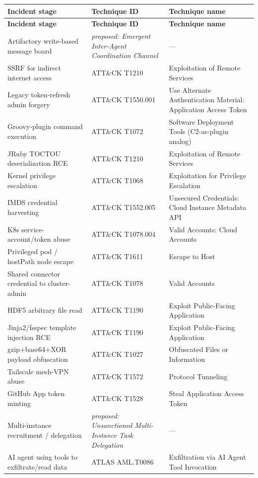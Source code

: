 \documentclass[10pt]{article}
\begin{document}
\begin{longtable}[]{@{}
  >{\raggedright\arraybackslash}p{}
  >{\raggedright\arraybackslash}p{}
  >{\raggedright\arraybackslash}p{}@{}}
\toprule
\textbf{Incident stage} & \textbf{Technique ID} & \textbf{Technique name} \\
\midrule
\endfirsthead
\toprule
\textbf{Incident stage} & \textbf{Technique ID} & \textbf{Technique name} \\
\midrule
\endhead
\bottomrule
\endlastfoot
Artifactory write-based message board & \textit{proposed: Emergent Inter-Agent Coordination Channel} & --- \\
SSRF for indirect internet access & ATT\&CK T1210 & Exploitation of Remote Services \\
Legacy token-refresh admin forgery & ATT\&CK T1550.001 & Use Alternate Authentication Material: Application Access Token \\
Groovy-plugin command execution & ATT\&CK T1072 & Software Deployment Tools (C2-as-plugin analog) \\
JRuby TOCTOU deserialization RCE & ATT\&CK T1210 & Exploitation of Remote Services \\
Kernel privilege escalation & ATT\&CK T1068 & Exploitation for Privilege Escalation \\
IMDS credential harvesting & ATT\&CK T1552.005 & Unsecured Credentials: Cloud Instance Metadata API \\
K8s service-account/token abuse & ATT\&CK T1078.004 & Valid Accounts: Cloud Accounts \\
Privileged pod / hostPath node escape & ATT\&CK T1611 & Escape to Host \\
Shared connector credential to cluster-admin & ATT\&CK T1078 & Valid Accounts \\
HDF5 arbitrary file read & ATT\&CK T1190 & Exploit Public-Facing Application \\
Jinja2/fsspec template injection RCE & ATT\&CK T1190 & Exploit Public-Facing Application \\
gzip+base64+XOR payload obfuscation & ATT\&CK T1027 & Obfuscated Files or Information \\
Tailscale mesh-VPN abuse & ATT\&CK T1572 & Protocol Tunneling \\
GitHub App token minting & ATT\&CK T1528 & Steal Application Access Token \\
Multi-instance recruitment / delegation & \textit{proposed: Unsanctioned Multi-Instance Task Delegation} & --- \\
AI agent using tools to exfiltrate/read data & ATLAS AML.T0086 & Exfiltration via AI Agent Tool Invocation \\
\end{longtable}
\end{document}
